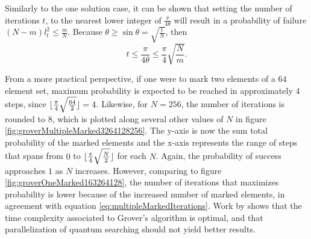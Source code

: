 \documentclass[../../dissertation.tex]{subfiles}
\begin{document}
Similarly to the one solution case, it can be shown that setting the number of
iterations $t$, to the nearest lower integer of $\frac{\pi}{4\theta}$ will
result in a probability of failure $(N-m)l^2_t \leq \frac{m}{N}$. Because
$\theta \geq \sin\theta = \sqrt{\frac{t}{N}}$, then
\begin{equation}
	t \leq \frac{\pi}{4\theta} \leq \frac{\pi}{4}\sqrt{\frac{N}{m}}.
	\label{eq:multipleMarkedIterations}
\end{equation}\par
From a more practical perspective, if one were to mark two elements of a $64$
element set, maximum probability is expected to be reached in approximately 4
steps, since $\lfloor\frac{\pi}{4}\sqrt{\frac{64}{2}}\rfloor = 4$. Likewise, for
$N=256$, the number of iterations is rounded to $8$, which is plotted along
several other values of $N$ in figure \ref{fig:groverMultipleMarked3264128256}.
The y-axis is now the sum total probability of the marked elements and the
x-axis represents the range of steps that spans from $0$ to
$\lfloor\frac{\pi}{4}\sqrt{\frac{N}{2}}\rfloor$ for each $N$.
Again, the probability of success approaches $1$ as $N$ increases. However,
comparing to figure \ref{fig:groverOneMarked163264128}, the number of
iterations that maximizes probability is lower because of the increased number of marked elements, in agreement with
equation \eqref{eq:multipleMarkedIterations}. Work by \cite{zalka1999} shows that
the time complexity associated to Grover's algorithm is optimal, and that
parallelization of quantum searching should not yield better results.
\end{document}
